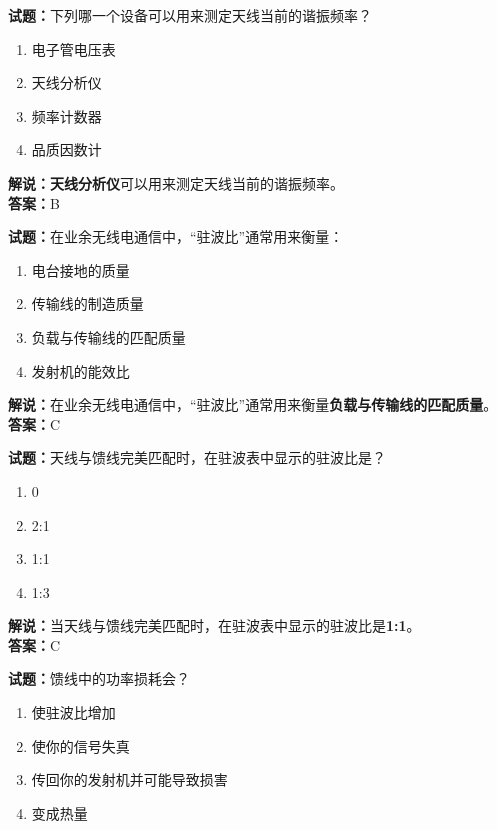 \documentclass{ctexbook}
\begin{document}
\bigskip

\noindent\textbf{试题：}下列哪一个设备可以用来测定天线当前的谐振频率？

\begin{enumerate}[leftmargin=3em]
  \item 电子管电压表
  \item 天线分析仪
  \item 频率计数器
  \item 品质因数计
\end{enumerate}

\noindent\textbf{解说：}\textbf{天线分析仪}可以用来测定天线当前的谐振频率。\\\noindent\textbf{答案：}B

\bigskip

\noindent\textbf{试题：}在业余无线电通信中，“驻波比”通常用来衡量：

\begin{enumerate}[leftmargin=3em]
  \item 电台接地的质量
  \item 传输线的制造质量
  \item 负载与传输线的匹配质量
  \item 发射机的能效比
\end{enumerate}

\noindent\textbf{解说：}在业余无线电通信中，“驻波比”通常用来衡量\textbf{负载与传输线的匹配质量}。\\\noindent\textbf{答案：}C

\bigskip

\noindent\textbf{试题：}天线与馈线完美匹配时，在驻波表中显示的驻波比是？

\begin{enumerate}[leftmargin=3em]
  \item 0
  \item 2:1
  \item 1:1
  \item 1:3
\end{enumerate}

\noindent\textbf{解说：}当天线与馈线完美匹配时，在驻波表中显示的驻波比是\textbf{1:1}。\\\noindent\textbf{答案：}C

\bigskip

\noindent\textbf{试题：}馈线中的功率损耗会？

\begin{enumerate}[leftmargin=3em]
  \item 使驻波比增加
  \item 使你的信号失真
  \item 传回你的发射机并可能导致损害
  \item 变成热量
\end{enumerate}
\end{document}
